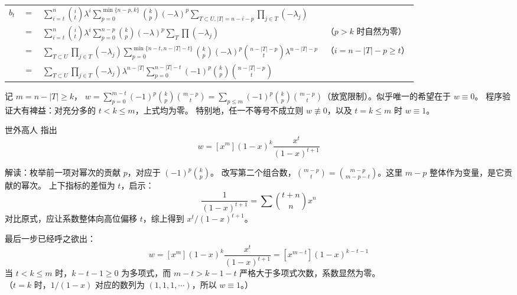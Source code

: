 \documentclass[12pt, a4paper, UTF8, openany]{ctexbook}
\begin{document}
        {\large \begin{longtable}[h]{c c l l}
            $b_t$ & $=$ & $\sum\limits_{i = t}^{n} \binom{i}{t} \lambda^i \sum\limits_{p = 0}^{\min\{n - p, k\}} \binom{k}{p}(-\lambda)^{p} \sum\limits_{T \subset U, |T| = n - i - p} \prod\limits_{j \in T} (-\lambda_j)$ & \\
            \addlinespace
            
            & $=$ & $\sum\limits_{i = t}^{n} \binom{i}{t} \lambda^i \sum\limits_{p = 0}^{n - p} \binom{k}{p}(-\lambda)^{p} \sum\limits_{T} \prod (-\lambda_j)$ & {\normalsize（$p > k$ 时自然为零）}\\
            \addlinespace

            & $=$ & $\sum\limits_{T \subset U} \prod\limits_{j \in T} (-\lambda_j) \sum\limits_{p = 0}^{\min\{n - t, n - |T| - t\}} \binom{k}{p} (-\lambda)^p \binom{n - |T| - p}{t} \lambda^{n - |T| - p}$ & {\normalsize（$i = n - |T| - p \geqslant t$）}\\
            \addlinespace

            & $=$ & $\sum\limits_{T \subset U} \prod\limits_{j \in T} (-\lambda_j) \lambda^{n - |T|} \sum\limits_{p = 0}^{n - |T| - t} (-1)^p \binom{k}{p} \binom{n - |T| - p}{t}$ &
        \end{longtable}}

        记 $m = n - |T| \geqslant k$，
        $w = \sum\limits_{p = 0}^{m - t} (-1)^p \binom{k}{p}\binom{m - p}{t} 
        = \sum\limits_{p \leqslant m} (-1)^p \binom{k}{p}\binom{m - p}{t}$（放宽限制）。似乎唯一的希望在于 $w \equiv 0$。
        程序验证大有裨益：对充分多的 $t < k \leqslant m$，上式均为零。
        特别地，任一不等号不成立则 $w \not\equiv 0$，以及 $t = k \leqslant m$ 时 $w \equiv 1$。

        世外高人 {}{} 指出
        $$w = [x^m](1 - x)^k\frac{x^t}{(1 - x)^{t + 1}}$$

        解读：枚举前一项对幂次的贡献 $p$，对应于 $(-1)^p\binom{k}{p}$。
        改写第二个组合数，$\binom{m - p}{t} = \binom{m - p}{m - p - t}$。这里 $m - p$ 整体作为变量，是它贡献的幂次。
        上下指标的差恒为 $t$，启示：
        $$\frac{1}{(1 - x)^{t + 1}} = \sum \binom{t + n}{n} x^n$$
        对比原式，应让系数整体向高位偏移 $t$，综上得到 $x^t / (1 - x)^{t + 1}$。

        最后一步已经呼之欲出：
        $$w = [x^m](1 - x)^k\frac{x^t}{(1 - x)^{t + 1}} = [x^{m - t}](1 - x)^{k - t - 1}$$
        当 $t < k \leqslant m$ 时，$k - t - 1 \geqslant 0$ 为多项式，而 $m - t > k - 1 - t$ 严格大于多项式次数，系数显然为零。\\
        （$t = k$ 时，$1 / (1 - x)$ 对应的数列为 $(1, 1, 1, \cdots)$，所以 $w \equiv 1$。）
\end{document}
